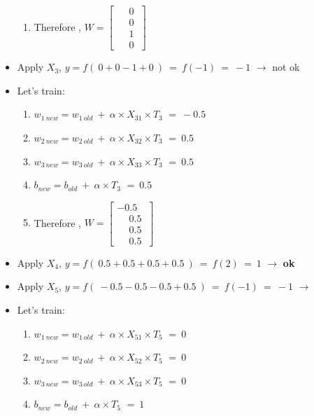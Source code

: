 \documentclass[12pt]{article}
\begin{document}
\begin{itemize}
{\begin{enumerate}
						\item Therefore , $ W= \begin{bmatrix}
						\phantom{-}0\ \\ 	
						\phantom{-}0\ \\ 	
						\phantom{-}1\ \\ 
						\phantom{-}0\  
					\end{bmatrix}$
			
				\end{enumerate}
			
			}
		
		\item Apply $X_3$, $y = f(\ 0 + 0 - 1 + 0\ ) \ = \ f(-1) \ = \ -1 $ $\rightarrow$ not ok
		
		\item Let's train:
		{
			\begin{enumerate}
				
				\item $w_{1\ new} = w_{1\ old}\ +\ \alpha \times X_{31} \times T_3$ $=\ -0.5$ 
				\item $w_{2\ new} = w_{2\ old}\ +\ \alpha \times X_{32} \times T_3$ $=\ 0.5$ 
				\item $w_{3\ new} = w_{3\ old}\ +\ \alpha \times X_{33} \times T_3$ $=\ 0.5$ 
				\item $b_{new} = b_{old} \ + \ \alpha \times T_3$ $= \ 0.5$
				
				\item Therefore , $ W= \begin{bmatrix}
					-0.5\ \\ 	
					\phantom{-}0.5\ \\ 	
					\phantom{-}0.5\  \\ 
					\phantom{-}0.5\   
				\end{bmatrix}$
				
			\end{enumerate}
			
		}
	
		\item Apply $X_4$, $y = f(\ 0.5 + 0.5 + 0.5 + 0.5\ ) \ = \ f(2) \ = \ 1 $ $\rightarrow$ \textbf{ok}
		
		\item Apply $X_5$, $y = f(\ -0.5 - 0.5 - 0.5 + 0.5\ ) \ = \ f(-1) \ = \ -1 $ $\rightarrow$ 
		
		\item Let's train:
		{
			\begin{enumerate}
				
				\item $w_{1\ new} = w_{1\ old}\ +\ \alpha \times X_{51} \times T_5$ $=\ 0$ 
				\item $w_{2\ new} = w_{2\ old}\ +\ \alpha \times X_{52} \times T_5$ $=\ 0$ 
				\item $w_{3\ new} = w_{3\ old}\ +\ \alpha \times X_{53} \times T_5$ $=\ 0$ 
				\item $b_{new} = b_{old} \ + \ \alpha \times T_5$ $= \ 1$
				

\end{enumerate}}
\end{itemize}
\end{document}

